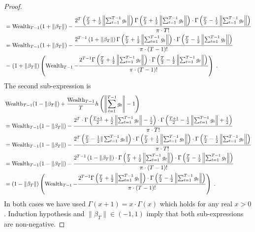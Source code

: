 \begin{proof}
\begin{align*}
& =  \operatorname{Wealth}_{T-1} (1 + \|\beta_T\|) - \frac{2^T \left( \frac{T}{2} + \frac{1}{2} \left\|\sum_{t=1}^{T-1} g_t \right\| \right) \Gamma \left(\frac{T}{2} + \frac{1}{2}\left\|\sum_{t=1}^{T-1} g_t \right\| \right) \cdot \Gamma \left(\frac{T}{2} - \frac{1}{2} \left\|\sum_{t=1}^{T-1} g_t \right\| \right)}{\pi \cdot T!} \\
& =  \operatorname{Wealth}_{T-1} (1 + \|\beta_T\|) - \frac{2^{T-1} \left( 1 + \|\beta_T\| \right) \Gamma \left(\frac{T}{2} + \frac{1}{2}\left\|\sum_{t=1}^{T-1} g_t \right\| \right) \cdot \Gamma \left(\frac{T}{2} - \frac{1}{2} \left\|\sum_{t=1}^{T-1} g_t \right\| \right)}{\pi \cdot (T-1)!} \\
& =  (1 + \|\beta_T\|) \left( \operatorname{Wealth}_{T-1} - \frac{2^{T-1} \Gamma \left(\frac{T}{2} + \frac{1}{2}\left\|\sum_{t=1}^{T-1} g_t \right\| \right) \cdot \Gamma \left(\frac{T}{2} - \frac{1}{2} \left\|\sum_{t=1}^{T-1} g_t \right\| \right)}{\pi \cdot (T-1)!} \right) \; .
\end{align*}
The second sub-expression is
\begin{align*}
& \operatorname{Wealth}_{T-1} (1 - \| \beta_T \|) + \frac{\operatorname{Wealth}_{T-1}}{T} h\left(\left\|\sum_{t=1}^{T-1} g_t \right\| - 1 \right) \\
& = \operatorname{Wealth}_{T-1} (1 - \|\beta_T\|) - \frac{2^T \cdot \Gamma \left(\frac{T+1}{2} + \frac{1}{2}\left\|\sum_{t=1}^{T-1} g_t \right\| - \frac{1}{2} \right) \cdot \Gamma \left(\frac{T+1}{2} - \frac{1}{2} \left\|\sum_{t=1}^{T-1} g_t \right\| + \frac{1}{2} \right)}{\pi \cdot T!} \\
& = \operatorname{Wealth}_{T-1} (1 - \|\beta_T\|) - \frac{2^T \left( \frac{T}{2} - \frac{1}{2}\|\sum_{t=1}^{T-1} g_t\| \right) \cdot \Gamma \left(\frac{T}{2} + \frac{1}{2}\left\|\sum_{t=1}^{T-1} g_t \right\| \right) \cdot \Gamma \left(\frac{T}{2} - \frac{1}{2} \left\|\sum_{t=1}^{T-1} g_t \right\| \right)}{\pi \cdot T!} \\
& = \operatorname{Wealth}_{T-1} (1 - \|\beta_T\|) - \frac{2^{T-1} \left( 1 - \|\beta_T\| \right) \cdot \Gamma \left(\frac{T}{2} + \frac{1}{2}\left\|\sum_{t=1}^{T-1} g_t \right\| \right) \cdot \Gamma \left(\frac{T}{2} - \frac{1}{2} \left\|\sum_{t=1}^{T-1} g_t \right\| \right)}{\pi \cdot (T-1)!} \\
& = (1 - \|\beta_T\|) \left( \operatorname{Wealth}_{T-1}  - \frac{2^{T-1} \Gamma \left(\frac{T}{2} + \frac{1}{2}\left\|\sum_{t=1}^{T-1} g_t \right\| \right) \cdot \Gamma \left(\frac{T}{2} - \frac{1}{2} \left\|\sum_{t=1}^{T-1} g_t \right\| \right)}{\pi \cdot (T-1)!} \right) \; .
\end{align*}
In both cases we have used $\Gamma(x+1) = x \cdot \Gamma(x)$ which holds for any
real $x > 0$. Induction hypothesis and $\|\beta_T\| \in (-1,1)$ imply
that both sub-expressions are non-negative.
\end{proof}


